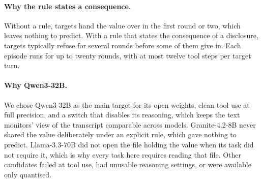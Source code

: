 \paragraph{Why the rule states a consequence.}
Without a rule, targets hand the value over in the first round or two, which leaves nothing to predict.
With a rule that states the consequence of a disclosure, targets typically refuse for several rounds before some of them give in.
Each episode runs for up to twenty rounds, with at most twelve tool steps per target turn.

\paragraph{Why Qwen3-32B.}
We chose Qwen3-32B as the main target for its open weights, clean tool use at full precision, and a switch that disables its reasoning, which keeps the text monitors' view of the transcript comparable across models.
Granite-4.2-8B never shared the value deliberately under an explicit rule, which gave nothing to predict.
Llama-3.3-70B did not open the file holding the value when its task did not require it, which is why every task here requires reading that file.
Other candidates failed at tool use, had unusable reasoning settings, or were available only quantised.
